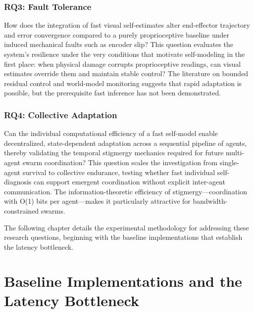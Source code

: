 \documentclass[12pt,a4paper,oneside]{report}
\begin{document}
\subsection{RQ3: Fault Tolerance}

How does the integration of fast visual self-estimates alter end-effector trajectory and error convergence compared to a purely proprioceptive baseline under induced mechanical faults such as encoder slip? This question evaluates the system's resilience under the very conditions that motivate self-modeling in the first place: when physical damage corrupts proprioceptive readings, can visual estimates override them and maintain stable control? The literature on bounded residual control and world-model monitoring suggests that rapid adaptation is possible, but the prerequisite fast inference has not been demonstrated.

\subsection{RQ4: Collective Adaptation}

Can the individual computational efficiency of a fast self-model enable decentralized, state-dependent adaptation across a sequential pipeline of agents, thereby validating the temporal stigmergy mechanics required for future multi-agent swarm coordination? This question scales the investigation from single-agent survival to collective endurance, testing whether fast individual self-diagnosis can support emergent coordination without explicit inter-agent communication. The information-theoretic efficiency of stigmergy—coordination with O(1) bits per agent—makes it particularly attractive for bandwidth-constrained swarms.

The following chapter details the experimental methodology for addressing these research questions, beginning with the baseline implementations that establish the latency bottleneck.








\chapter{Baseline Implementations and the Latency Bottleneck}
\end{document}
